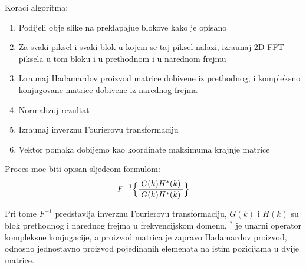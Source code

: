 Koraci algoritma\cite{phaseonly}:
\begin{enumerate}
\item Podijeli obje slike na preklapaju\cj e blokove kako je opisano
\item Za svaki piksel i svaki blok u kojem se taj piksel nalazi, izra\ch unaj 2D FFT piksela u tom bloku i u prethodnom i u narednom frejmu
\item Izra\ch unaj Hadamardov proizvod matrice dobivene iz prethodnog, i kompleksno konjugovane matrice dobivene iz narednog frejma
\item Normalizuj rezultat
\item Izra\ch unaj inverznu Fourierovu transformaciju
\item Vektor pomaka dobijemo kao koordinate maksimuma krajnje matrice
\end{enumerate}

Proces mo\zh e biti opisan sljede\cj om formulom:
\[
F^{-1}\Bigl\{\frac{G(k)H^*(k)}{|G(k)H^*(k)|}\Bigr\}
\]

Pri tome $F^{-1}$ predstavlja inverznu Fourierovu transformaciju, $G(k)$ i $H(k)$ su blok prethodnog i narednog frejma u frekvencijskom domenu, $^*$ je unarni operator kompleksne konjugacije, a proizvod matrica je zapravo Hadamardov
proizvod, odnosno jednostavno proizvod pojedina\ch nih elemenata na istim pozicijama u dvije matrice. 